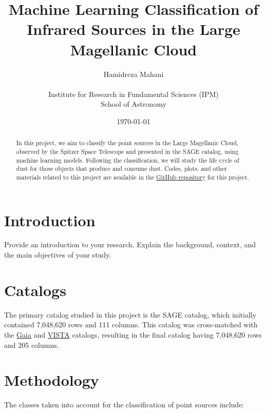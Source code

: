 \documentclass[a4paper, 15pt,usenatbib]{article}
\title{Machine Learning Classification of Infrared
Sources in the Large Magellanic Cloud}
\author{Hamidreza Mahani \\
    \\
        Institute for Research in Fundamental Sciences (IPM) \\
        School of Astronomy}
\date{\today}
\begin{document}
\maketitle

\begin{abstract}
    In this project, we aim to classify the point sources in the Large Magellanic Cloud, observed by the Spitzer Space Telescope and presented in the SAGE catalog, using machine learning models. Following the classification, we will study the life cycle of dust for those objects that produce and consume dust. Codes, plots, and other materials related to this project are available in the \href{https://github.com/hmahani/LMC_Machine_Learning}{GitHub repository} for this project.
\end{abstract}

\tableofcontents
\newpage

\section{Introduction}
Provide an introduction to your research. Explain the background, context, and the main objectives of your study. 

\section{Catalogs}
The primary catalog studied in this project is the SAGE catalog, which initially contained 7,048,620 rows and 111 columns. This catalog was cross-matched with the \href{https://vizier.cds.unistra.fr/viz-bin/VizieR-3?-source=I/350&-out.max=50&-out.form=HTML%20Table&-out.add=_r&-out.add=_RAJ,_DEJ&-sort=_r&-oc.form=sexa}{Gaia} \citep{GaiaDR3} and \href{https://vizier.cds.unistra.fr/viz-bin/VizieR-3?-source=II/375&-out.max=50&-out.form=HTML%20Table&-out.add=_r&-out.add=_RAJ,_DEJ&-sort=_r&-oc.form=sexa}{VISTA} \citep{Cioni11_Vista} catalogs, resulting in the final catalog having 7,048,620 rows and 205 columns.

\section{Methodology}
The classes taken into account for the classification of point sources include:
\end{document}
